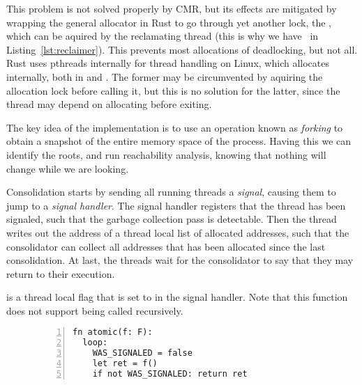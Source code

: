 This problem is not solved properly by CMR, but its effects are mitigated by wrapping the general
allocator in Rust to go through yet another lock, the , which can be aquired by
the reclamating thread (this is why we have~ in Listing~\ref{lst:reclaimer}). This
prevents most allocations of deadlocking, but not all. Rust uses pthreads internally for thread
handling on Linux, which allocates internally, both in  and . The former may
be circumvented by aquiring the allocation lock before calling it, but this is no solution for the
latter, since the thread may depend on allocating before exiting.




\clearpage
\vspace{2cm}


The key idea of the implementation is to use an operation known as \emph{forking} to obtain a
snapshot of the entire memory space of the process. Having this we can identify the roots, and run
reachability analysis, knowing that nothing will change while we are looking.

Consolidation starts by sending all running threads a \emph{signal}, causing them to jump to a
\emph{signal handler}. The signal handler registers that the thread has been signaled, such that the
garbage collection pass is detectable. Then the thread writes out the address of a thread local
list of allocated addresses, such that the consolidator can collect all addresses that has been
allocated since the last consolidation. At last, the threads wait for the consolidator to say that
they may return to their execution. 


   is a thread local flag that is
  set to  in the signal handler. Note that this function does not support being called
  recursively.
\begin{figure}[ht]
  \begin{lstlisting}[numbers=left,numberstyle=\color{gray}\ttfamily{}A,caption=Pseudocode of $atomic$]
fn atomic(f: F):
  loop:
    WAS_SIGNALED = false
    let ret = f()
    if not WAS_SIGNALED: return ret
\end{lstlisting}
\end{figure}

